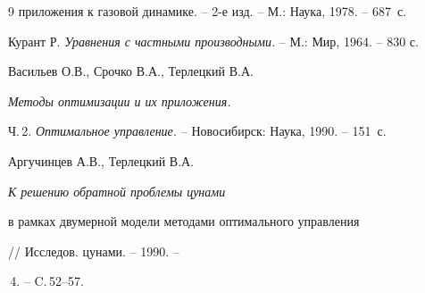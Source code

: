 \begin{thebibliography}{9}
{приложения к газовой динамике}. -- 2-е изд. -- М.: Наука, 1978. -- 687~с.




Курант Р. {\it Уравнения с частными производными.} -- М.: Мир, 1964. -- 830 с.




Васильев О.В., Срочко В.А., Терлецкий В.А.


{\it Методы оптимизации и их приложения.}


Ч.\,2. {\it Оптимальное управление.} -- Новосибирск: Наука, 1990. -- 151~с.




Аргучинцев А.В., Терлецкий В.А. {\it К решению обратной проблемы цунами


в рамках двумерной модели методами оптимального управления}


// Исследов. цунами. -- 1990. --


\No\,4. -- C.\,52--57.





\end{thebibliography}





\vskip 2cm












\label{end}








